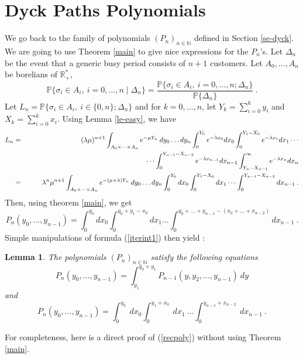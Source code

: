 \documentclass[11pt,a4paper]{article}
\numberwithin{equation}{section}
\newtheorem{lem}[prop]{Lemma}
\newcommand{\R}{\mathbb{R}}
\newcommand{\1}{\mathbbm{1}}
\newcommand{\p}{\mathbb{P}}
\newcommand{\N}{\mathbb{N}}
\begin{document}
\section{Dyck Paths Polynomials}
We go back to the family of polynomials $(P_n)_{n \in \N}$ defined in Section
\ref{se-dyck}. We are going to use Theorem \ref{main} to give nice expressions for the $P_n$'s.
Let $\Delta_{n}$ be the event that a generic busy period consists of
$n+1$ customers.
Let $A_0,\dots,A_n$ be borelians of $\R_+^*$,
\begin{equation*}
\p\{\sigma_i \in A_i,\: i=0,\dots ,n \mid \Delta_n\} = \frac{\p\{\sigma_i
\in A_i,\: i =0,\dots ,n ; \Delta_n\}}{\p\{\Delta_n\}}\:.
\end{equation*}
Let $L_n =\p\{\sigma_i \in A_i,\: i \in\{0,n\};\Delta_n\}$ and for
$k=0,\dots,n$, let $Y_k = \sum_{i=0} ^{k}y_i$ and $X_k = \sum_{i=0}
^{k}x_i$. Using Lemma \ref{le-easy}, we have
\begin{eqnarray*}
L_n&=&(\lambda \mu)^{n+1}\int_{A_0 \times \dots \times A_n}e^{-\mu
Y_n}\: dy_0 \dots dy_n \int_0^{Y_0}e^{-\lambda x_0} dx_0\int_0^{Y_1-X_0}e^{-\lambda
x_1}dx_1\cdots \\
&&\hspace*{6cm} \cdots \int_0^{Y_{n-1}-X_{n-2}}e^{-\lambda x_{n-1}}
dx_{n-1}\int_{Y_n-X_{n-1}}^{\infty}e^{-\lambda x_n} dx_n\\
&=&\lambda^{n} \mu^{n+1} \int_{A_0\times \dots\times A_n}e^{- (\mu +
  \lambda)Y_n}\:dy_0\dots dy_n
\int_0^{Y_0} dx_0 \int_0^{Y_1-X_0}
dx_1\cdots\int_0^{Y_{n-1}-X_{n-2}}dx_{n-1}\:.
\end{eqnarray*}
Then, using theorem \ref{main}, we get
\begin{equation}\label{iterint1}
P_n(y_0,\dots,y_{n-1})=\int_{0}^{y_0}dx_0\int_{0}^{y_0+y_1-x_0}dx_1\dots\int_{0}^{y_0+\dots+y_{n-1}-(x_0+\dots+x_{n-2})}dx_{n-1}\:.
\end{equation}
Simple manipulations of formula (\ref{iterint1}) then yield :
\begin{lem}\label{recursion}
The polynomials $(P_n)_{n \in \N}$ satisfy the following equations
\begin{equation}\label{recpoly}
P_n(y_0,\dots,y_{n-1})=\int_{y_1}^{y_0+y_1}
P_{n-1}(y,y_2,\dots,y_{n-1})\:dy
\end{equation}
and
\begin{equation}\label{recpoly2}
P_n(y_0,\dots,y_{n-1}) =\int_{0}^{y_0}\:dx_0
 \int_{0}^{y_1+x_0}\:dx_1\:\dots\int_{0}^{y_{n-1}+x_{n-2}}\:dx_{n-1}\:.
\end{equation}
\end{lem}
For completeness, here is a direct proof of (\ref{recpoly}) without using Theorem \ref{main}.
\end{document}
